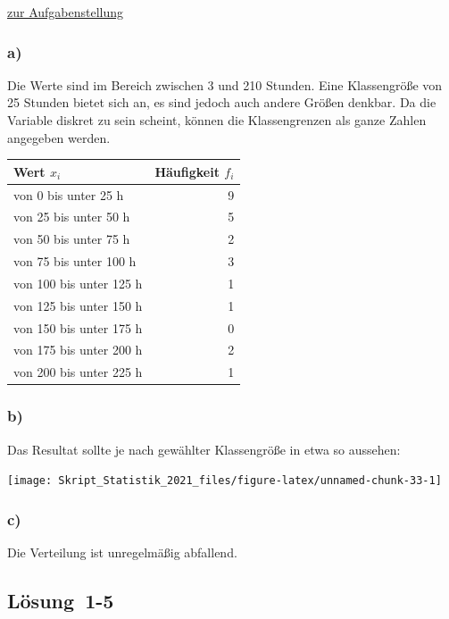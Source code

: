 \documentclass[
  11pt,
  ngerman,
  a4paper,
]{report}
\begin{document}
\protect\hyperlink{aufgabe-1-4}{zur Aufgabenstellung}

\hypertarget{a-1}{%
\subsubsection{a)}\label{a-1}}

Die Werte sind im Bereich zwischen 3 und 210 Stunden. Eine Klassengröße von 25 Stunden bietet sich an, es sind jedoch auch andere Größen denkbar. Da die Variable diskret zu sein scheint, können die Klassengrenzen als ganze Zahlen angegeben werden.

\begin{table}[H]
\centering
\begin{tabular}{lr}
\toprule
\textbf{Wert $x_i$} & \textbf{Häufigkeit $f_i$}\\
\midrule
von 0 bis unter 25 h & 9\\
von 25 bis unter 50 h & 5\\
von 50 bis unter 75 h & 2\\
von 75 bis unter 100 h & 3\\
von 100 bis unter 125 h & 1\\
von 125 bis unter 150 h & 1\\
von 150 bis unter 175 h & 0\\
von 175 bis unter 200 h & 2\\
von 200 bis unter 225 h & 1\\
\bottomrule
\end{tabular}
\end{table}

\hypertarget{b-1}{%
\subsubsection{b)}\label{b-1}}

Das Resultat sollte je nach gewählter Klassengröße in etwa so aussehen:

\begin{center}\texttt{[image: Skript\_Statistik\_2021\_files/figure-latex/unnamed-chunk-33-1]} \end{center}

\hypertarget{c-1}{%
\subsubsection{c)}\label{c-1}}

Die Verteilung ist unregelmäßig abfallend.

\hypertarget{loesung-1-5}{%
\subsection{Lösung~1-5}\label{loesung-1-5}}
\end{document}

